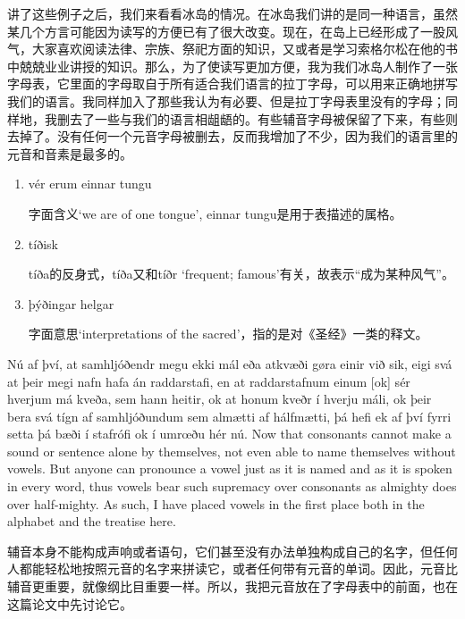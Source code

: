 \begin{translation*}{}
    讲了这些例子之后，我们来看看冰岛的情况。在冰岛我们讲的是同一种语言，虽然某几个方言可能因为读写的方便已有了很大改变。现在，在岛上已经形成了一股风气，大家喜欢阅读法律、宗族、祭祀方面的知识，又或者是学习索格尔松在他的书中兢兢业业讲授的知识。那么，为了使读写更加方便，我为我们冰岛人制作了一张字母表，它里面的字母取自于所有适合我们语言的拉丁字母，可以用来正确地拼写我们的语言。我同样加入了那些我认为有必要、但是拉丁字母表里没有的字母；同样地，我删去了一些与我们的语言相龃龉的。有些辅音字母被保留了下来，有些则去掉了。没有任何一个元音字母被删去，反而我增加了不少，因为我们的语言里的元音和音素是最多的。
\end{translation*}
\begin{grammar*}{}
    \begin{enumerate}[leftmargin=*]
        \item vér erum einnar tungu

              字面含义`we are of one tongue', einnar tungu是用于表描述的属格。

        \item tíðisk

              tíða的反身式，tíða又和tíðr `frequent; famous'有关，故表示“成为某种风气”。

        \item þýðingar helgar

              字面意思`interpretations of the sacred'，指的是对《圣经》一类的释文。
    \end{enumerate}
\end{grammar*}
\begin{paracol}{2}
    Nú af því, at samhljóðendr megu ekki mál eða atkvæði gøra einir við sik, eigi svá at þeir megi nafn hafa án raddarstafi, en at raddarstafnum einum [ok] sér hverjum má kveða, sem hann heitir, ok at honum kveðr í hverju máli, ok þeir bera svá tígn af samhljóðundum sem almætti af hálfmætti, þá hefi ek af því fyrri setta þá bæði í stafrófi ok í umrœðu hér nú.
    \switchcolumn
    Now that consonants cannot make a sound or sentence alone by themselves, not even able to name themselves without vowels. But anyone can pronounce a vowel just as it is named and as it is spoken in every word, thus vowels bear such supremacy over consonants as almighty does over half-mighty. As such, I have placed vowels in the first place both in the alphabet and the treatise here.
\end{paracol}
\begin{translation*}{}
    辅音本身不能构成声响或者语句，它们甚至没有办法单独构成自己的名字，但任何人都能轻松地按照元音的名字来拼读它，或者任何带有元音的单词。因此，元音比辅音更重要，就像纲比目重要一样。所以，我把元音放在了字母表中的前面，也在这篇论文中先讨论它。
\end{translation*}
